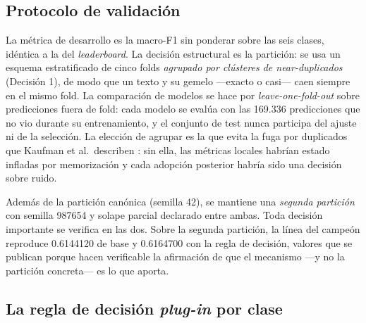 \documentclass[journal]{IEEEtai}
\begin{document}
\subsection{Protocolo de validaci\'on}

La m\'etrica de desarrollo es la macro-F1 sin ponderar sobre las seis clases, id\'entica a la del \textit{leaderboard}. La decisi\'on estructural es la partici\'on: se usa un esquema estratificado de cinco folds \emph{agrupado por cl\'usteres de \textit{near-duplicados}} (Decisi\'on 1), de modo que un texto y su gemelo ---exacto o casi--- caen siempre en el mismo fold. La comparaci\'on de modelos se hace por \emph{leave-one-fold-out} sobre predicciones fuera de fold: cada modelo se eval\'ua con las 169.336 predicciones que no vio durante su entrenamiento, y el conjunto de test nunca participa del ajuste ni de la selecci\'on. La elecci\'on de agrupar es la que evita la fuga por duplicados que Kaufman et al.\ describen \cite{kaufman2012}: sin ella, las m\'etricas locales habr\'ian estado infladas por memorizaci\'on y cada adopci\'on posterior habr\'ia sido una decisi\'on sobre ruido.

Adem\'as de la partici\'on can\'onica (semilla 42), se mantiene una \emph{segunda partici\'on} con semilla 987654 y solape parcial declarado entre ambas. Toda decisi\'on importante se verifica en las dos. Sobre la segunda partici\'on, la l\'inea del campe\'on reproduce 0.6144120 de base y 0.6164700 con la regla de decisi\'on, valores que se publican porque hacen verificable la afirmaci\'on de que el mecanismo ---y no la partici\'on concreta--- es lo que aporta.

\subsection{La regla de decisi\'on \textit{plug-in} por clase}
\end{document}
